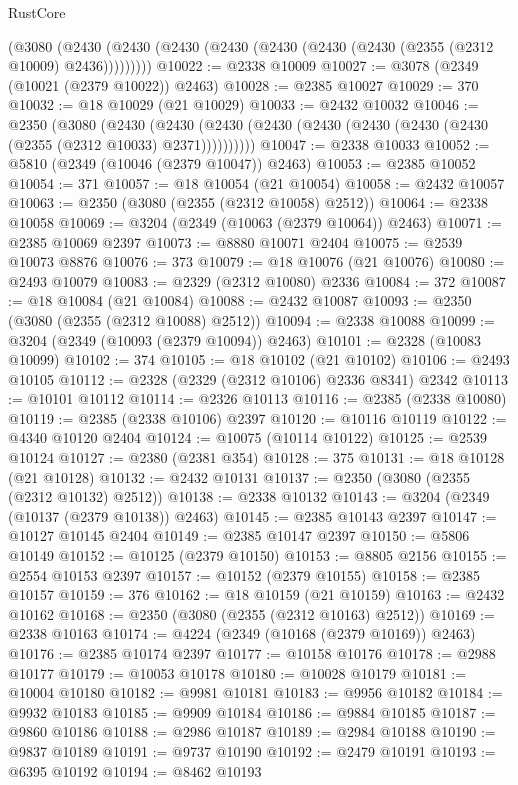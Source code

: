 \begin{lexlean}{RustCore}
\begin{coremodule}
    (@3080 (@2430 (@2430 (@2430 (@2430 (@2430 (@2430 (@2430 (@2355 (@2312 @10009) @2436)))))))))
@10022 := @2338 @10009
@10027 := @3078 (@2349 (@10021 (@2379 @10022)) @2463)
@10028 := @2385 @10027
@10029 := 370
@10032 := @18 @10029 (@21 @10029)
@10033 := @2432 @10032
@10046 := @2350
    (@3080
      (@2430 (@2430 (@2430 (@2430 (@2430 (@2430 (@2430 (@2430 (@2355 (@2312 @10033) @2371))))))))))
@10047 := @2338 @10033
@10052 := @5810 (@2349 (@10046 (@2379 @10047)) @2463)
@10053 := @2385 @10052
@10054 := 371
@10057 := @18 @10054 (@21 @10054)
@10058 := @2432 @10057
@10063 := @2350 (@3080 (@2355 (@2312 @10058) @2512))
@10064 := @2338 @10058
@10069 := @3204 (@2349 (@10063 (@2379 @10064)) @2463)
@10071 := @2385 @10069 @2397
@10073 := @8880 @10071 @2404
@10075 := @2539 @10073 @8876
@10076 := 373
@10079 := @18 @10076 (@21 @10076)
@10080 := @2493 @10079
@10083 := @2329 (@2312 @10080) @2336
@10084 := 372
@10087 := @18 @10084 (@21 @10084)
@10088 := @2432 @10087
@10093 := @2350 (@3080 (@2355 (@2312 @10088) @2512))
@10094 := @2338 @10088
@10099 := @3204 (@2349 (@10093 (@2379 @10094)) @2463)
@10101 := @2328 (@10083 @10099)
@10102 := 374
@10105 := @18 @10102 (@21 @10102)
@10106 := @2493 @10105
@10112 := @2328 (@2329 (@2312 @10106) @2336 @8341) @2342
@10113 := @10101 @10112
@10114 := @2326 @10113
@10116 := @2385 (@2338 @10080)
@10119 := @2385 (@2338 @10106) @2397
@10120 := @10116 @10119
@10122 := @4340 @10120 @2404
@10124 := @10075 (@10114 @10122)
@10125 := @2539 @10124
@10127 := @2380 (@2381 @354)
@10128 := 375
@10131 := @18 @10128 (@21 @10128)
@10132 := @2432 @10131
@10137 := @2350 (@3080 (@2355 (@2312 @10132) @2512))
@10138 := @2338 @10132
@10143 := @3204 (@2349 (@10137 (@2379 @10138)) @2463)
@10145 := @2385 @10143 @2397
@10147 := @10127 @10145 @2404
@10149 := @2385 @10147 @2397
@10150 := @5806 @10149
@10152 := @10125 (@2379 @10150)
@10153 := @8805 @2156
@10155 := @2554 @10153 @2397
@10157 := @10152 (@2379 @10155)
@10158 := @2385 @10157
@10159 := 376
@10162 := @18 @10159 (@21 @10159)
@10163 := @2432 @10162
@10168 := @2350 (@3080 (@2355 (@2312 @10163) @2512))
@10169 := @2338 @10163
@10174 := @4224 (@2349 (@10168 (@2379 @10169)) @2463)
@10176 := @2385 @10174 @2397
@10177 := @10158 @10176
@10178 := @2988 @10177
@10179 := @10053 @10178
@10180 := @10028 @10179
@10181 := @10004 @10180
@10182 := @9981 @10181
@10183 := @9956 @10182
@10184 := @9932 @10183
@10185 := @9909 @10184
@10186 := @9884 @10185
@10187 := @9860 @10186
@10188 := @2986 @10187
@10189 := @2984 @10188
@10190 := @9837 @10189
@10191 := @9737 @10190
@10192 := @2479 @10191
@10193 := @6395 @10192
@10194 := @8462 @10193

\end{coremodule}
\end{lexlean}
